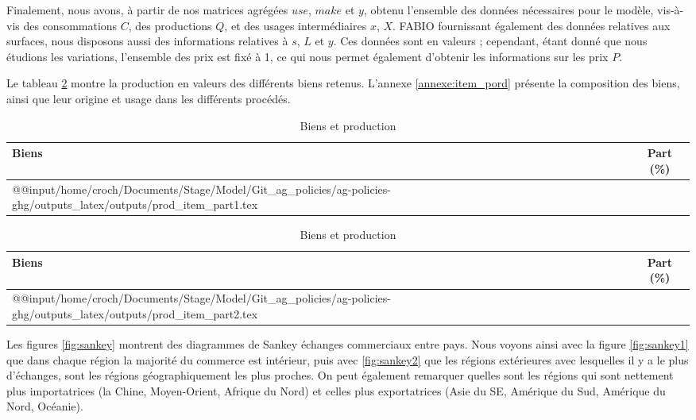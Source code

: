 Finalement, nous avons, à partir de nos matrices agrégées $use$, $make$ et $y$, obtenu l'ensemble des données nécessaires pour le modèle, vis-à-vis des consommations $C$, des productions $Q$, et des usages intermédiaires $x$, $X$. FABIO fournissant également des données relatives aux surfaces, nous disposons aussi des informations relatives à $s$, $L$ et $y$. Ces données sont en valeurs ; cependant, étant donné que nous étudions les variations, l'ensemble des prix est fixé à 1, ce qui nous permet également d'obtenir les informations sur les prix $P$.

Le tableau \ref{tab:prod_item} montre la production en valeurs des différents biens retenus. L'annexe \ref{annexe:item_pord} présente la composition des biens, ainsi que leur origine et usage dans les différents procédés.


\begin{table}[h!]
    \centering
    \begin{threeparttable}
        \begin{minipage}[t]{0.49\textwidth}
            \centering
            \begin{tabularx}{\textwidth}{p{1.8in}c}
                \textbf{Biens} & \textbf{Part} (\%) \\ \hline
                \csname @@input\endcsname /home/croch/Documents/Stage/Model/Git_ag_policies/ag-policies-ghg/outputs_latex/outputs/prod_item_part1.tex
                \hline
            \end{tabularx}
        \end{minipage}
        \begin{minipage}[t]{0.49\textwidth}
            \centering
            \begin{tabularx}{\textwidth}{p{2in}c}
                \textbf{Biens} & \textbf{Part} (\%)                                                                                                   \\ \hline
                \csname @@input\endcsname /home/croch/Documents/Stage/Model/Git_ag_policies/ag-policies-ghg/outputs_latex/outputs/prod_item_part2.tex \\
                \hline
            \end{tabularx}
        \end{minipage}
        \caption{Biens et production}
        \label{tab:prod_item}
    \end{threeparttable}
\end{table}

Les figures \ref{fig:sankey} montrent des diagrammes de Sankey échanges commerciaux entre pays. Nous voyons ainsi avec la figure \ref{fig:sankey1} que dans chaque région la majorité du commerce est intérieur, puis avec \ref{fig:sankey2} que les régions extérieures avec lesquelles il y a le plus d'échanges, sont les régions géographiquement les plus proches. On peut également remarquer quelles sont les régions qui sont nettement plus importatrices (la Chine, Moyen-Orient, Afrique du Nord) et celles plus exportatrices (Asie du SE, Amérique du Sud, Amérique du Nord, Océanie).

